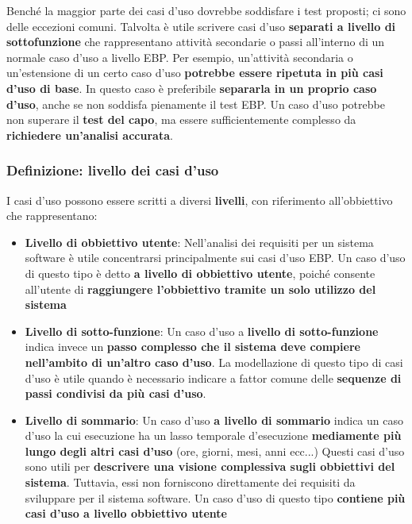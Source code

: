 \documentclass[12pt]{article}
\begin{document}
Benché la maggior parte dei casi d'uso dovrebbe soddisfare i test proposti; ci sono delle eccezioni comuni.
Talvolta è utile scrivere casi d'uso \textbf{separati a livello di sottofunzione} che rappresentano attività secondarie o passi all'interno di un normale caso d'uso a livello EBP.
Per esempio, un'attività secondaria o un'estensione di un certo caso d'uso \textbf{potrebbe essere ripetuta in più casi d'uso di base}.
In questo caso è preferibile \textbf{separarla in un proprio caso d'uso}, anche se non soddisfa pienamente il test EBP.
Un caso d'uso potrebbe non superare il \textbf{test del capo}, ma essere sufficientemente complesso da \textbf{richiedere un'analisi accurata}.
\subsubsection{Definizione: livello dei casi d'uso}
I casi d'uso possono essere scritti a diversi \textbf{livelli}, con riferimento all'obbiettivo che rappresentano:
\begin{itemize}
    \item \textbf{Livello di obbiettivo utente}: Nell'analisi dei requisiti per un sistema software è utile concentrarsi principalmente sui casi d'uso EBP.
    Un caso d'uso di questo tipo è detto \textbf{a livello di obbiettivo utente}, poiché consente all'utente di \textbf{raggiungere l'obbiettivo tramite un solo utilizzo del sistema}
    \item \textbf{Livello di sotto-funzione}: Un caso d'uso a \textbf{livello di sotto-funzione} indica invece un \textbf{passo complesso che il sistema deve compiere nell'ambito di un'altro caso d'uso}.
    La modellazione di questo tipo di casi d'uso è utile quando è necessario indicare a fattor comune delle \textbf{sequenze di passi condivisi da più casi d'uso}.
    \item \textbf{Livello di sommario}: Un caso d'uso \textbf{a livello di sommario} indica un caso d'uso la cui esecuzione ha un lasso temporale d'esecuzione \textbf{mediamente più lungo degli altri casi d'uso} (ore, giorni, mesi, anni ecc...)
    Questi casi d'uso sono utili per \textbf{descrivere una visione complessiva sugli obbiettivi del sistema}. Tuttavia, essi non forniscono direttamente dei requisiti da sviluppare per il sistema software.
    Un caso d'uso di questo tipo \textbf{contiene più casi d'uso a livello obbiettivo utente}
\end{itemize}
\end{document}
